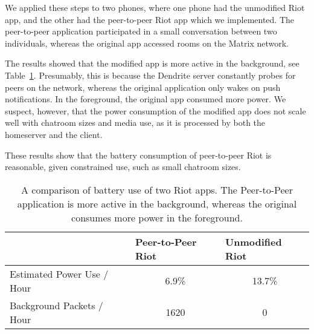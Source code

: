 We applied these steps to two phones, where one phone had the unmodified Riot app, and the other had the peer-to-peer Riot app which we implemented.
The peer-to-peer application participated in a small conversation between two individuals, whereas the original app accessed rooms on the Matrix network.

The results showed that the modified app is more active in the background, see Table~\ref{tab:battery_comparison}.
Presumably, this is because the Dendrite server constantly probes for peers on the network, whereas the original application only wakes on push notifications.
In the foreground, the original app consumed more power.
We suspect, however, that the power consumption of the modified app does not scale well with chatroom sizes and media use, as it is processed by both the homeserver and the client.

These results show that the battery consumption of peer-to-peer Riot is reasonable, given constrained use, such as small chatroom sizes.


\begin{table}[]
	\centering
	\begin{tabular}{@{}lcc@{}}
		\toprule
		                           & \multicolumn{1}{l}{\textbf{Peer-to-Peer Riot}} & \multicolumn{1}{l}{\textbf{Unmodified Riot}} \\ \midrule
		Estimated Power Use / Hour & 6.9\%                                          & 13.7\%                                       \\
		Background Packets / Hour  & 1620                                           & 0                                            \\ \bottomrule
	\end{tabular}
	\caption{A comparison of battery use of two Riot apps. The Peer-to-Peer application is more active in the background, whereas the original consumes more power in the foreground.}%
	\label{tab:battery_comparison}
\end{table}


